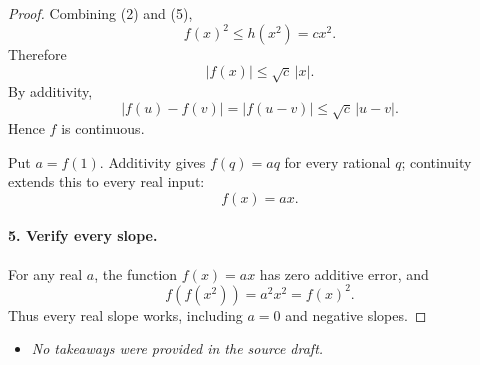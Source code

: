 \begin{dlsummary}[title={\bfseries Solution 56. The Microscopic Error Trap},breakable]
\begin{proof}
Combining (2) and (5),
\[
f(x)^2\le h(x^2)=cx^2.
\]
Therefore
\[
\boxed{|f(x)|\le\sqrt c\,|x|.} \tag{6}
\]
By additivity,
\[
|f(u)-f(v)|=|f(u-v)|\le\sqrt c\,|u-v|.
\]
Hence \(f\) is continuous.

Put \(a=f(1)\). Additivity gives \(f(q)=aq\) for every rational \(q\); continuity extends this to every real input:
\[
f(x)=ax.
\]

\paragraph{5. Verify every slope.}

For any real \(a\), the function \(f(x)=ax\) has zero additive error, and
\[
f(f(x^2))=a^2x^2=f(x)^2.
\]
Thus every real slope works, including \(a=0\) and negative slopes.
\end{proof}
\end{dlsummary}

\begin{takeaways}
\begin{itemize}
\item \emph{No takeaways were provided in the source draft.}
\end{itemize}
\end{takeaways}
